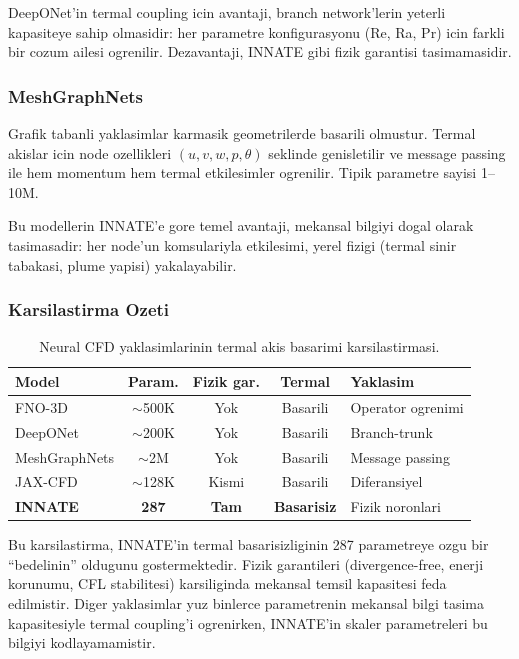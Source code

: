 DeepONet'in termal coupling icin avantaji, branch network'lerin yeterli
kapasiteye sahip olmasidir: her parametre konfigurasyonu (Re, Ra, Pr) icin
farkli bir cozum ailesi ogrenilir. Dezavantaji, INNATE gibi fizik
garantisi tasimamasidir.


\subsubsection{MeshGraphNets}

Grafik tabanli yaklasimlar \cite{pfaff2021meshgraphnets} karmasik
geometrilerde basarili olmustur. Termal akislar icin node ozellikleri
$(u, v, w, p, \theta)$ seklinde genisletilir ve message passing ile hem
momentum hem termal etkilesimler ogrenilir. Tipik parametre sayisi 1--10M.

Bu modellerin INNATE'e gore temel avantaji, mekansal bilgiyi dogal olarak
tasimasadir: her node'un komsulariyla etkilesimi, yerel fizigi (termal sinir
tabakasi, plume yapisi) yakalayabilir.


\subsubsection{Karsilastirma Ozeti}

\begin{table}[H]
  \centering
  \caption{Neural CFD yaklasimlarinin termal akis basarimi karsilastirmasi.}
  \label{tab:comparison}
  \begin{tabular}{lcccl}
    \toprule
    Model & Param. & Fizik gar. & Termal & Yaklasim \\
    \midrule
    FNO-3D           & $\sim$500K  & Yok    & Basarili & Operator ogrenimi \\
    DeepONet         & $\sim$200K  & Yok    & Basarili & Branch-trunk \\
    MeshGraphNets    & $\sim$2M    & Yok    & Basarili & Message passing \\
    JAX-CFD          & $\sim$128K  & Kismi  & Basarili & Diferansiyel \\
    \textbf{INNATE}  & \textbf{287}& \textbf{Tam} & \textbf{Basarisiz} & Fizik noronlari \\
    \bottomrule
  \end{tabular}
\end{table}

Bu karsilastirma, INNATE'in termal basarisizliginin 287 parametreye ozgu
bir ``bedelinin'' oldugunu gostermektedir. Fizik garantileri (divergence-free,
enerji korunumu, CFL stabilitesi) karsiliginda mekansal temsil kapasitesi
feda edilmistir. Diger yaklasimlar yuz binlerce parametrenin mekansal
bilgi tasima kapasitesiyle termal coupling'i ogrenirken, INNATE'in skaler
parametreleri bu bilgiyi kodlayamamistir.

